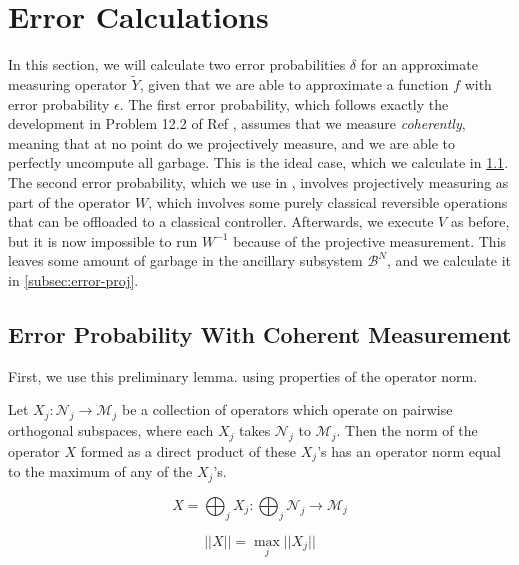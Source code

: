 \section{Error Calculations}

In this section, we will calculate two error probabilities $\delta$ for
an approximate measuring operator $\tilde{Y}$, given that we are able to
approximate a function $f$ with error probability $\epsilon$. The first
error probability, which follows exactly the development in Problem 12.2
of Ref \cite{Kitaev2002}, assumes that we measure \emph{coherently}, meaning
that at no point do we projectively measure, and we are able to perfectly
uncompute all garbage. This is the ideal case, which we calculate in
\ref{subsec:error-noproj}. The second error probability, which we use in
\cite{Pham2012a}, involves projectively measuring as part of the operator $W$,
which involves some purely classical reversible operations that can be
offloaded to a classical controller. Afterwards, we execute $V$ as before,
but it is now impossible to run $W^{-1}$ because of the projective measurement.
This leaves some amount of garbage in the ancillary
subsystem $\mathcal{B}^N$, and we calculate it in \ref{subsec:error-proj}.

\subsection{Error Probability With Coherent Measurement}
\label{subsec:error-noproj}

First, we use this preliminary lemma. using properties of
the operator norm.

\begin{lemma}
\label{lemma:sum-norm}
Let $X_j : \mathcal{N}_j \rightarrow \mathcal{M}_j $
be a collection of operators which operate on pairwise orthogonal
subspaces, where each $X_j$ takes $\mathcal{N}_j$ to $\mathcal{M}_j$.
Then the norm of the operator $X$ formed as a direct product of these
$X_j$'s has an operator norm equal to the maximum of any of the
$X_j$'s.

\begin{equation}
X = \bigoplus_j X_j : \bigoplus_j \mathcal{N}_j \rightarrow \mathcal{M}_j
\end{equation}

\begin{equation}
|| X || = \max_{j} ||X_j||
\end{equation}
\end{lemma}

